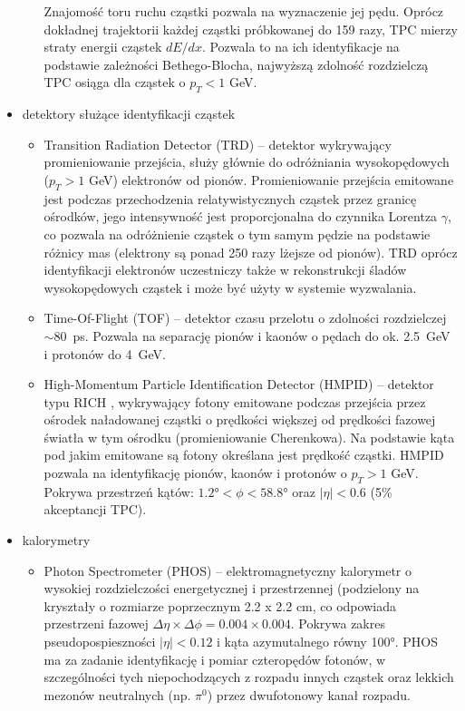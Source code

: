 \begin{itemize}
\begin{itemize}
		Znajomość toru ruchu cząstki pozwala na wyznaczenie jej pędu. Oprócz dokładnej trajektorii każdej cząstki próbkowanej do 159 razy, TPC mierzy straty energii cząstek $dE/dx$. Pozwala to na ich identyfikacje na podstawie zależności Bethego-Blocha, najwyższą zdolność rozdzielczą TPC osiąga dla cząstek o $p_T < 1$ GeV.
	\end{itemize}
	\item detektory służące identyfikacji cząstek 
	\begin{itemize}
		\item Transition Radiation Detector (TRD) -- detektor wykrywający promieniowanie przejścia, służy głównie do odróżniania wysokopędowych ($p_T > 1$ GeV) elektronów od pionów. Promieniowanie przejścia emitowane jest podczas przechodzenia relatywistycznych cząstek przez granicę ośrodków, jego intensywność jest proporcjonalna do czynnika Lorentza $\gamma$, co pozwala na odróżnienie cząstek o tym samym pędzie na podstawie różnicy mas (elektrony są ponad 250 razy lżejsze od pionów). TRD oprócz identyfikacji elektronów uczestniczy także w rekonstrukcji śladów wysokopędowych cząstek i może być użyty w systemie wyzwalania.
		\item Time-Of-Flight (TOF) -- detektor czasu przelotu o zdolności rozdzielczej $\sim80$~ps. Pozwala na separację pionów i kaonów o pędach do ok. 2.5~GeV i protonów do 4~GeV.  
		\item High-Momentum Particle Identification Detector (HMPID) -- detektor typu RICH , wykrywający fotony emitowane podczas przejścia przez ośrodek naładowanej cząstki o prędkości większej od prędkości fazowej światła w tym ośrodku (promieniowanie Cherenkowa). Na podstawie kąta pod jakim emitowane są fotony określana jest prędkość cząstki. HMPID pozwala na identyfikację pionów, kaonów i protonów o $p_T > 1$ GeV. Pokrywa przestrzeń kątów: $\ang{1.2} < \phi < \ang{58.8}$ oraz $|\eta| < 0.6$ (5\% akceptancji TPC).
	\end{itemize}
	\item kalorymetry
	\begin{itemize}
		\item Photon Spectrometer (PHOS) -- elektromagnetyczny kalorymetr o wysokiej rozdzielczości energetycznej i przestrzennej (podzielony na kryształy o rozmiarze poprzecznym 2.2 x 2.2 cm, co odpowiada przestrzeni fazowej $\Delta\eta\times\Delta\phi = 0.004 \times 0.004$. Pokrywa zakres pseudopospieszności $|\eta| < 0.12$ i kąta azymutalnego równy \ang{100}. PHOS ma za zadanie identyfikację i pomiar czteropędów fotonów, w szczególności tych niepochodzących z rozpadu innych cząstek  oraz lekkich mezonów neutralnych (np. $\pi^0$) przez dwufotonowy kanał rozpadu.

\end{itemize}
\end{itemize}
